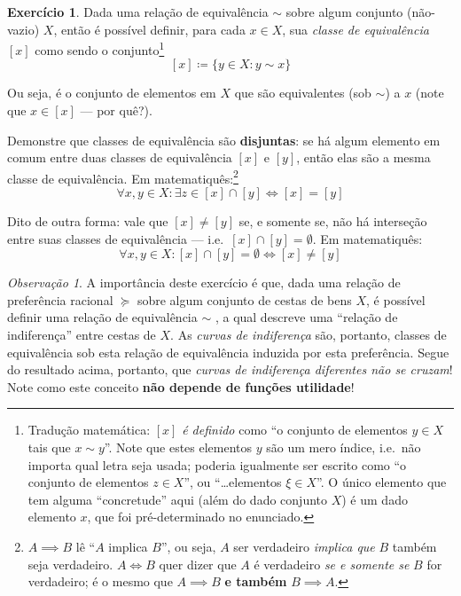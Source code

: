 \documentclass[12pt]{article}
\numberwithin{equation}{section}
\theoremstyle{plain}
\theoremstyle{definition}
\newtheorem{exercise}{Exercício}
\theoremstyle{remark}
\newtheorem*{remark}{Observação}
\begin{document}
\begin{exercise}
  Dada uma relação de equivalência \(\sim\) sobre
algum conjunto (não-vazio) \(X\), então é possível definir, para cada
\(x \in X\), sua \emph{classe de equivalência} \([x]\) como sendo o
conjunto\footnote{Tradução matemática: \([x]\) \emph{é definido} como
  ``o conjunto de elementos \(y \in X\) tais que \(x \sim y\)''. Note
  que estes elementos \(y\) são um mero índice, i.e.~não importa qual
  letra seja usada; poderia igualmente ser escrito como ``o conjunto de
  elementos \(z \in X\)'', ou ``\ldots elementos \(\xi \in X\)''. O
  único elemento que tem alguma ``concretude'' aqui (além do dado
  conjunto \(X\)) é um dado elemento \(x\), que foi pré-determinado no
  enunciado.} \[
[x] \coloneqq \{y \in X: y \sim x\}
\]

Ou seja, é o conjunto de elementos em \(X\) que são equivalentes (sob
\(\sim\)) a \(x\) (note que \(x \in [x]\) --- por quê?).

Demonstre que classes de equivalência são \textbf{disjuntas}: se há
algum elemento em comum entre duas classes de equivalência \([x]\) e
\([y]\), então elas são a mesma classe de equivalência. Em matematiquês:\footnote{\(A \implies B\) lê ``\(A\) implica \(B\)'', ou seja, \(A\)
  ser verdadeiro \emph{implica que} \(B\) também seja verdadeiro.
  \(A \iff B\) quer dizer que \(A\) é verdadeiro \emph{se e somente se}
  \(B\) for verdadeiro; é o mesmo que \(A \implies B\) \textbf{e também}
  \(B \implies A\).}
\[
\forall x, y \in X: \exists z \in [x] \cap [y] \iff [x] = [y]
\]

  Dito de outra forma: vale que $[x] \neq [y]$ se, e somente se, não há interseção entre suas classes de equivalência --- i.e.~\([x] \cap [y] = \emptyset\). Em matematiquês: \[
\forall x, y \in X: [x] \cap [y] = \emptyset \iff [x] \neq [y]
\]


\begin{remark}
  A importância deste exercício é que, dada uma relação de preferência
  racional \(\succeq\) sobre algum conjunto de cestas de bens \(X\), é
  possível definir uma relação de equivalência \(\sim\) , a qual descreve
  uma ``relação de indiferença'' entre cestas de \(X\). As \emph{curvas de
  indiferença} são, portanto, classes de equivalência sob esta relação de
  equivalência induzida por esta preferência. Segue do resultado acima,
  portanto, que \emph{curvas de indiferença diferentes não se cruzam}! Note como este conceito \textbf{não depende de funções utilidade}! 
  \end{remark}
\end{exercise}
\end{document}
